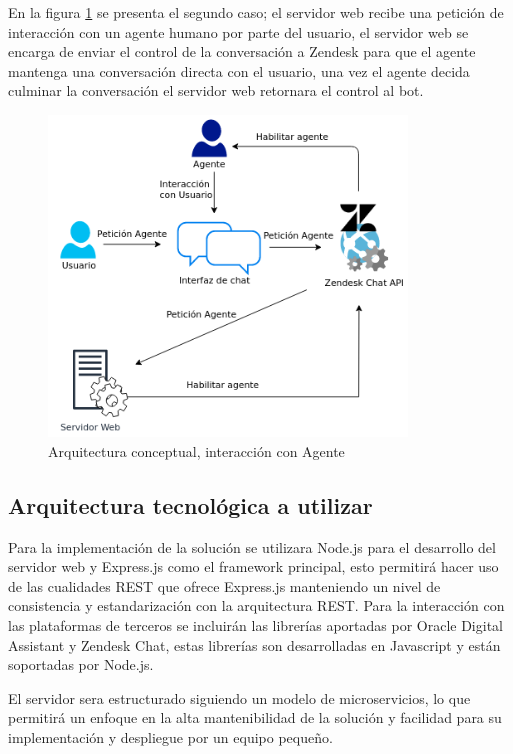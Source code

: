     En la figura \ref{fig:arqconagente} se presenta el segundo caso; el servidor web recibe una petición de interacción con un agente humano por parte del usuario, el servidor web se encarga de enviar el control de la conversación a Zendesk para que el agente mantenga una conversación directa con el usuario, una vez el agente decida culminar la conversación el servidor web retornara el control al bot.
    
    \begin{figure}[htpb]
        \centering
        \includegraphics[width=0.85\textwidth]{Figuras/propuestasolucion2.png}
        \caption{Arquitectura conceptual, interacción con Agente}
        \label{fig:arqconagente}
    \end{figure}
    
    
    \subsection{Arquitectura tecnológica a utilizar}
    Para la implementación de la solución se utilizara Node.js para el desarrollo del servidor web y Express.js como el framework principal, esto permitirá hacer uso de las cualidades REST que ofrece Express.js manteniendo un nivel de consistencia y estandarización con la arquitectura REST. Para la interacción con las plataformas de terceros se incluirán las librerías aportadas por Oracle Digital Assistant y Zendesk Chat, estas librerías son desarrolladas en Javascript y están soportadas por Node.js. 
    
    El servidor sera estructurado siguiendo un modelo de microservicios, lo que permitirá un enfoque en la alta mantenibilidad de la solución y facilidad para su implementación y despliegue por un equipo pequeño.
    
